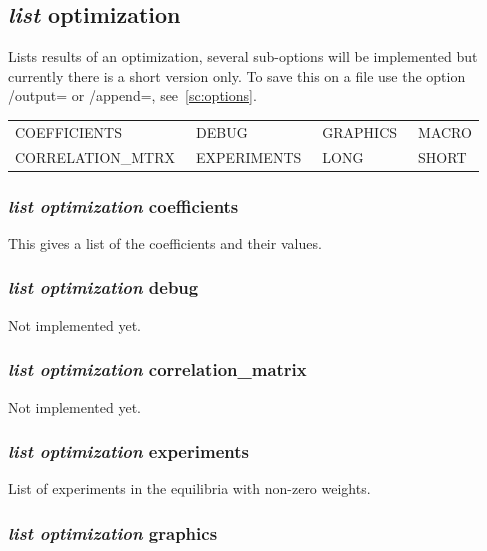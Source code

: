 \documentclass[11pt]{article}
\begin{document}
\subsection{{\em list} optimization}

Lists results of an optimization, several sub-options will be
implemented but currently there is a short version only.  To save this
on a file use the option /output= or /append=, see~\ref{sc:options}.

{\small
  \begin{tabular}{llll}
COEFFICIENTS      & DEBUG        & GRAPHICS~      & MACRO     \\
CORRELATION\_MTRX~ & EXPERIMENTS~  & LONG          & SHORT \\
  \end{tabular}
  }
\hypertarget{List optimization coefficiets}{}
\subsubsection{{\em list optimization} coefficients}

This gives a list of the coefficients and their values.

\hypertarget{list optimization debug}{}
\subsubsection{{\em list optimization} debug}

Not implemented yet.

\hypertarget{List Optimization correlation-mtrx}{}
\subsubsection{{\em list optimization} correlation\_matrix}

Not implemented yet.

\hypertarget{list optimization experiments}{}
\subsubsection{{\em list optimization} experiments}

List of experiments in the equilibria with non-zero weights.

\hypertarget{List optimization graphics}{}
\subsubsection{{\em list optimization} graphics}
\end{document}
